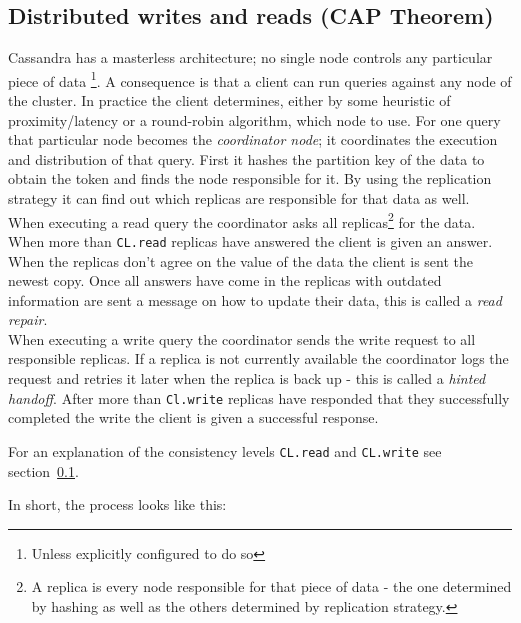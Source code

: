 \subsection{Distributed writes and reads (CAP Theorem)} \label{subsec:cassandra:cap}

Cassandra has a masterless architecture; no single node controls any particular piece of data \autocite[5]{lakshman2010cassandra}\footnote{Unless explicitly configured to do so}. A consequence is that a client can run queries against any node of the cluster. In practice the client determines, either by some heuristic of proximity/latency or a round-robin algorithm, which node to use.
For one query that particular node becomes the \textit{coordinator node}; it coordinates the execution and distribution of that query.
First it hashes the partition key of the data to obtain the token and finds the node responsible for it. By using the replication strategy it can find out which replicas are responsible for that data as well. \\
When executing a read query the coordinator asks all replicas\footnote{A replica is every node responsible for that piece of data - the one determined by hashing as well as the others determined by replication strategy.} for the data. When more than \texttt{CL.read} replicas have answered the client is given an answer. When the replicas don't agree on the value of the data the client is sent the newest copy. Once all answers have come in the replicas with outdated information are sent a message on how to update their data, this is called a \textit{read repair}. \autocite{cassandra_distributed_read} \\
When executing a write query the coordinator sends the write request to all responsible replicas. If a replica is not currently available the coordinator logs the request and retries it later when the replica is back up  - this is called a \textit{hinted handoff}\autocite[6,7]{cassandraInCAPtheorem}. After more than \texttt{Cl.write} replicas have responded that they successfully completed the write the client is given a successful response. \autocite{cassandra_distributed_write}

For an explanation of the consistency levels \texttt{CL.read} and \texttt{CL.write} see section~\ref{subsec:cassandra:cap}.

In short, the process looks like this:

